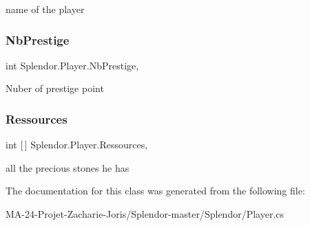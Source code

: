 name of the player 

\mbox{\label{class_splendor_1_1_player_ad92459d327fa7cc546259931af417aa1}} 
\subsubsection{\texorpdfstring{Nb\+Prestige}{NbPrestige}}
{\footnotesize\ttfamily int Splendor.\+Player.\+Nb\+Prestige\hspace{0.3cm}{\ttfamily [get]}, {\ttfamily [set]}}



Nuber of prestige point 

\mbox{\label{class_splendor_1_1_player_a1c5ccd2470e3bbc84e9a156bc323bfd0}} 
\subsubsection{\texorpdfstring{Ressources}{Ressources}}
{\footnotesize\ttfamily int \mbox{[}$\,$\mbox{]} Splendor.\+Player.\+Ressources\hspace{0.3cm}{\ttfamily [get]}, {\ttfamily [set]}}



all the precious stones he has 



The documentation for this class was generated from the following file\+:\begin{DoxyCompactItemize}
\item 
M\+A-\/24-\/\+Projet-\/\+Zacharie-\/\+Joris/\+Splendor-\/master/\+Splendor/Player.\+cs\end{DoxyCompactItemize}
